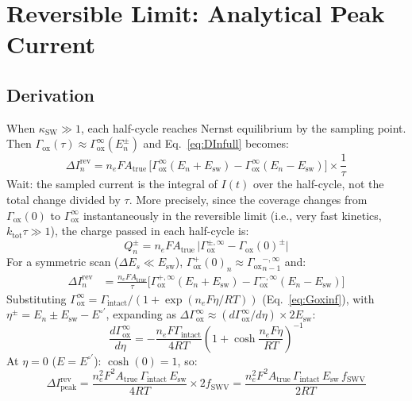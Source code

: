 \documentclass[10pt,a4paper]{article}
\numberwithin{equation}{section}
\newcommand{\Eo}{E^{\circ\prime}}
\newcommand{\Gox}{\Gamma_{\text{ox}}}
\newcommand{\Gtot}{\Gamma_{\text{intact}}}
\newcommand{\DI}{\Delta I}
\newcommand{\Esw}{E_{\text{sw}}}
\newcommand{\Des}{\Delta E_s}
\begin{document}
\section{Reversible Limit: Analytical Peak Current}
\label{sec:revlimit}

\subsection{Derivation}

When $\kappa_{\text{SW}} \gg 1$, each half-cycle reaches Nernst
equilibrium by the sampling point. Then $\Gox(\tau) \approx \Gox^\infty(E^\pm_n)$
and Eq.~\eqref{eq:DInfull} becomes:
\begin{equation}
  \DI_n^{\text{rev}} = n_e F A_{\text{true}}\,
  \bigl[\Gox^\infty(E_n + \Esw) - \Gox^\infty(E_n - \Esw)\bigr]
  \times \frac{1}{\tau}
  \label{eq:DIrev_raw}
\end{equation}
Wait: the sampled current is the integral of $I(t)$ over the half-cycle,
not the total change divided by $\tau$. More precisely, since the
coverage changes from $\Gox(0)$ to $\Gox^\infty$ instantaneously in
the reversible limit (i.e., very fast kinetics, $k_{\text{tot}}\tau \gg 1$),
the charge passed in each half-cycle is:
\begin{equation}
  Q^\pm_n = n_e F A_{\text{true}}\,\bigl|\Gox^{\pm,\infty} - \Gox(0)^\pm\bigr|
  \label{eq:Qhalf}
\end{equation}
For a symmetric scan ($\Des \ll \Esw$), $\Gox^+(0)_n \approx {\Gox}^{-,\infty}_{n-1}$
and:
\begin{align}
  \DI_n^{\text{rev}} &= \frac{n_e F A_{\text{true}}}{\tau}
  \bigl[\Gox^{+,\infty}(E_n+\Esw) - \Gox^{-,\infty}(E_n-\Esw)\bigr]
  \label{eq:DIrevNernst}
\end{align}
Substituting $\Gox^\infty = \Gtot/(1+\exp(n_e F\eta/RT))$
(Eq.~\ref{eq:Goxinf}), with $\eta^\pm = E_n \pm \Esw - \Eo$,
expanding as $\Delta\Gox^\infty \approx (d\Gox^\infty/d\eta)\times 2\Esw$:
\begin{equation}
  \frac{d\Gox^\infty}{d\eta} = -\frac{n_e F \Gtot}{4RT}
  \left(1 + \cosh\!\frac{n_e F\eta}{RT}\right)^{-1}
  \label{eq:dGoxdeta}
\end{equation}
At $\eta = 0$ ($E = \Eo$): $\cosh(0) = 1$, so:
\begin{equation}
  \DI_{\text{peak}}^{\text{rev}} = \frac{n_e^2 F^2 A_{\text{true}}\,\Gtot\,\Esw}{4RT}
  \times 2f_{\text{SWV}}
  = \frac{n_e^2 F^2 A_{\text{true}}\,\Gtot\,\Esw\,f_{\text{SWV}}}{2RT}
  \label{eq:DIpeak}
\end{equation}
\end{document}
